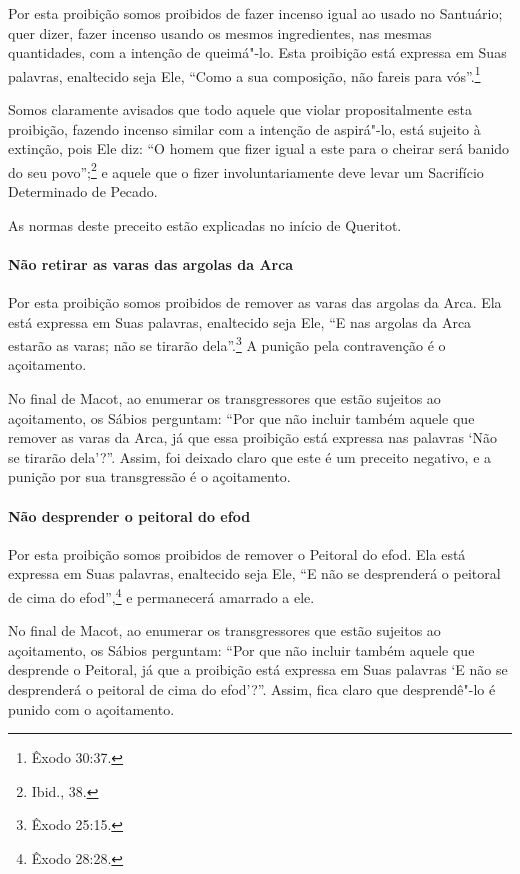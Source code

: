 \begin{multicols}{2}
Por esta proibição somos proibidos de fazer incenso igual ao usado no
Santuário; quer dizer, fazer incenso usando os mesmos ingredientes, nas
mesmas quantidades, com a intenção de queimá"-lo. Esta proibição está
expressa em Suas palavras, enaltecido seja Ele, ``Como a sua composição,
não fareis para vós''.\footnote{Êxodo 30:37.}

Somos claramente avisados que todo aquele que violar propositalmente
esta proibição, fazendo incenso similar com a intenção de aspirá"-lo,
está sujeito à extinção, pois Ele diz: ``O homem que fizer igual a este
para o cheirar será banido do seu povo'';\footnote{Ibid., 38.} e aquele que o
fizer involuntariamente deve levar um Sacrifício Determinado de Pecado.

As normas deste preceito estão explicadas no início de Queritot\starr.

\paragraph{Não retirar as varas das argolas da Arca}

Por esta proibição somos proibidos de remover as varas das argolas da
Arca. Ela está expressa em Suas palavras, enaltecido seja Ele, ``E nas
argolas da Arca estarão as varas; não se tirarão dela''.\footnote{Êxodo 25:15.} A
punição pela contravenção é o açoitamento.

No final de Macot\starr, ao enumerar os transgressores que estão sujeitos ao
açoitamento, os Sábios perguntam: ``Por que não incluir também aquele
que remover as varas da Arca, já que essa proibição está expressa nas
palavras `Não se tirarão dela'?''. Assim, foi deixado claro que este é
um preceito negativo, e a punição por sua transgressão é o açoitamento.

\paragraph{Não desprender o peitoral do efod\starr}

Por esta proibição somos proibidos de remover o Peitoral do
efod\starr. Ela está expressa em Suas palavras,
enaltecido seja Ele, ``E não se
desprenderá o peitoral de cima do efod\starr'',\footnote{Êxodo 28:28.} e permanecerá
amarrado a ele.

No final de Macot\starr, ao enumerar os transgressores que estão sujeitos ao
açoitamento, os Sábios perguntam: ``Por que não incluir também aquele
que desprende o Peitoral, já que a proibição está expressa em Suas
palavras `E não se desprenderá o peitoral de cima do efod\starr'?''. Assim,
fica claro que desprendê"-lo é punido com o açoitamento.


\end{multicols}
